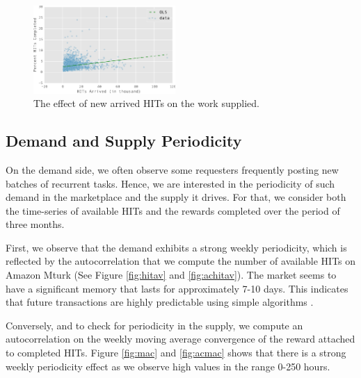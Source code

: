 \begin{figure}[t!]
	\centering
	\includegraphics[width=0.48\textwidth]{figures/percent.pdf}
	\caption{The effect of new arrived HITs on the work  supplied.}
	\label{fig:perc_hits_completed}
\end{figure}

\subsection{Demand and Supply Periodicity}
On the demand side, we often observe some requesters frequently posting new batches of recurrent tasks. Hence, we are interested in the periodicity of such demand in the marketplace and the supply it drives. For that, we consider both the time-series of available HITs and the rewards completed over the period of three months. 

First, we observe that the demand exhibits a strong weekly periodicity, which is reflected by the autocorrelation that we compute the number of available HITs on Amazon Mturk (See Figure \ref{fig:hitav} and \ref{fig:achitav}). The market seems to have a significant memory that lasts for approximately 7-10 days.
This indicates that future transactions are highly predictable using simple algorithms \cite{marketmemory}.

Conversely, and to check for periodicity in the supply, we compute an autocorrelation on the weekly moving average convergence of the reward attached to completed HITs. Figure \ref{fig:mac} and \ref{fig:acmac} shows that there is a strong weekly periodicity effect as we observe high values in the range 0-250 hours.

